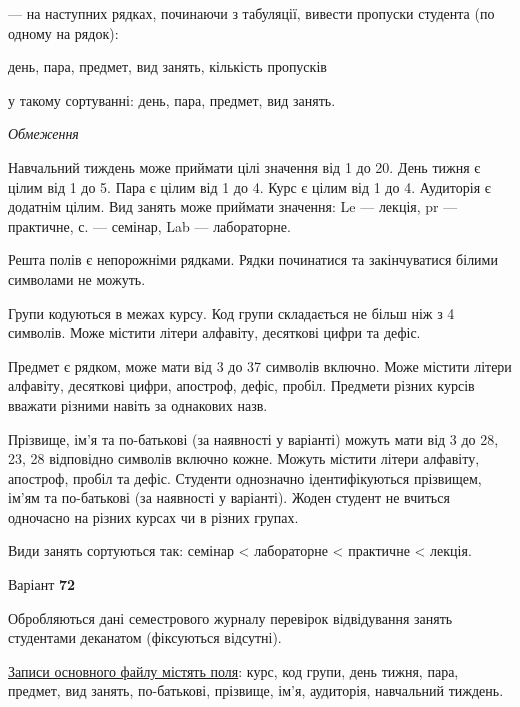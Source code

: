 \documentclass[11pt, ukrainian]{article}
\begin{document}
{\noindent}--- на наступних рядках, починаючи з табуляції, вивести пропуски студента (по одному на рядок):\par
день, пара, предмет, вид занять, кількість пропусків

{\noindent}у такому сортуванні: день, пара, предмет, вид занять.


\bigskip\textit{Обмеження}

Навчальний тиждень може приймати цілі значення від 1 до 20.
День тижня є цілим від 1 до 5. Пара є цілим від 1 до 4.
Курс є цілим від 1 до 4. Аудиторія є додатнім цілим.
Вид занять може приймати значення:
Le --- лекція, pr --- практичне, с. --- семінар, Lab --- лабораторне.

Решта полів є непорожніми рядками.
Рядки починатися та закінчуватися білими символами не можуть.

Групи кодуються в межах курсу.
Код групи складається не більш ніж з 4 символів.
Може містити літери алфавіту, десяткові цифри та дефіс.

Предмет є рядком, може мати від 3 до 37 символів включно.
Може містити літери алфавіту, десяткові цифри, апостроф, дефіс, пробіл.
Предмети різних курсів вважати різними навіть за однакових назв.

Прізвище, ім’я та по-батькові (за наявності у варіанті)
можуть мати від 3 до 28, 23, 28 відповідно символів включно кожне.
Можуть містити літери алфавіту, апостроф, пробіл та дефіс.
Студенти однозначно ідентифікуються прізвищем, ім’ям та по-батькові (за наявності у варіанті).
Жоден студент не вчиться одночасно на різних курсах чи в різних групах.

Види занять сортуються так: семінар < лабораторне < практичне < лекція.





\par
\newpage
{\center Варіант  \No \textbf { 72 }\par}
\bigskip
Обробляються дані семестрового журналу перевірок відвідування занять студентами деканатом (фіксуються відсутні). 

\underline{Записи основного файлу містять поля}: курс, код групи, день тижня, пара, предмет, вид занять, по-батькові, прізвище, ім’я, аудиторія, навчальний тиждень.
\end{document}
